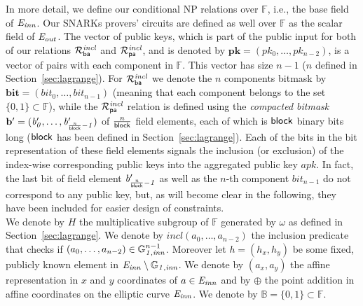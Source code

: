 \noindent In more detail, we define our conditional NP relations over $\mathbb{F}$, i.e., the base field of $\mathit{E}_{\mathit{inn}}$. 
Our SNARKs provers' circuits are defined as well over $\mathbb{F}$ as the scalar field of $\mathit{E}_{\mathit{out}}$. The vector of public keys, which is part of the public input for both of our 
relations $\mathcal{R}^{\mathit{incl}}_{\mathsf{ba}}$ and $\mathcal{R}^{\mathit{incl}}_{\mathsf{pa}}$, and is denoted by $\mathbf{pk} = (\mathit{pk_0}, \ldots, \mathit{pk_{n-2}})$, is a vector of pairs with each component 
in $\mathbb{F}$. This vector has size $n-1$ ($n$ defined in 
Section~\ref{sec:lagrange}). For $\mathcal{R}^{\mathit{incl}}_{\mathsf{ba}}$ we denote 
the $n$ components bitmask by $\mathbf{bit} = (\mathit{bit_0}, \ldots, \mathit{bit_{n-1}})$ 
(meaning that each component belongs to the set $\{0,1\} \subset \mathbb{F}$), 
while the $\mathcal{R}^{\mathit{incl}}_{\mathsf{pa}}$ relation is defined using the \emph{compacted bitmask} 
$\mathbf{b'} = (\mathit{b'_{0}}, \ldots, \mathit{b'_{\frac{n}{\mathsf{block}}-1}})$ of $\frac{n}{\mathsf{block}}$ field elements, 
each of which is $\mathsf{block}$ binary bits long ($\mathsf{block}$ has been defined in Section~\ref{sec:lagrange}). 
Each of the bits in the bit representation of these field elements signals the 
inclusion (or exclusion) of the index-wise corresponding public keys into the aggregated public key $\mathit{apk}$. In fact, 
the last bit of field element $\mathit{b'_{\frac{n}{\mathsf{block}}-1}}$ as well as the $n$-th component $\mathit{bit_{n-1}}$ do not correspond to any public key, 
but, as will become clear in the following, they have been included for easier design of constraints. \\ 

\noindent We denote by $H$ the multiplicative subgroup of $\mathbb{F}$ generated 
by $\omega$ as defined in Section~\ref{sec:lagrange}. We denote by  $\mathit{incl}(a_0, \ldots, a_{n-2})$ the inclusion 
predicate that checks if $(a_0, \ldots, a_{n-2}) \in \mathbb{G}_{\mathit{1,inn}}^{n-1}$. Moreover let $h = (\mathit{h_x}, \mathit{h_y})$ 
be some fixed, publicly known element in $\mathit{E}_{\mathit{inn}} \setminus \mathbb{G}_{\mathit{1,inn}}$. We denote by $(a_x, a_y)$ the affine representation in 
$x$ and $y$ coordinates of $a \in \mathit{E}_{\mathit{inn}}$ and by $\oplus$ the point addition in affine coordinates on the elliptic curve $\mathit{E}_{\mathit{inn}}$. 
We denote by $\mathbb{B} = \{0,1\} \subset \mathbb{F}$. \\

